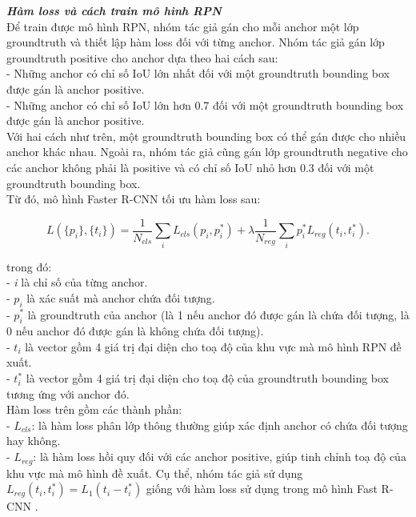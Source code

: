 {    \noindent
    \textbf{\textit{Hàm loss và cách train mô hình RPN}} \\
    Để train được mô hình RPN, nhóm tác giả gán cho mỗi anchor một lớp groundtruth và thiết lập hàm loss đối với từng anchor.
    Nhóm tác giả gán lớp groundtruth positive cho anchor dựa theo hai cách sau: \\
    - Những anchor có chỉ số IoU lớn nhất đối với một groundtruth bounding box được gán là anchor positive. \\
    - Những anchor có chỉ số IoU lớn hơn 0.7 đối với một groundtruth bounding box được gán là anchor positive. \\
    Với hai cách như trên, một groundtruth bounding box có thể gán được cho nhiều anchor khác nhau.
    Ngoài ra, nhóm tác giả cũng gán lớp groundtruth negative cho các anchor không phải là positive và có chỉ số IoU nhỏ hơn 0.3 đối với một groundtruth bounding box. \\
    Từ đó, mô hình Faster R-CNN tối ưu hàm loss sau:

    \begin{equation}
        \label{eq:faster_rcnn_loss}
        L(\{p_i\}, \{t_i\}) = \frac{1}{N_{cls}}\sum_i L_{cls}(p_i, p^{*}_i) + \lambda\frac{1}{N_{reg}}\sum_i  p^{*}_i L_{reg}(t_i, t^{*}_i).
    \end{equation}

    \noindent
    trong đó: \\
    - \textit{i} là chỉ số của từng anchor. \\
    - \textit{$p_i$} là xác suất mà anchor chứa đối tượng. \\
    - \textit{$p^{*}_i$} là groundtruth của anchor (là 1 nếu anchor đó được gán là chứa đối tượng, là 0 nếu anchor đó được gán là không chứa đối tượng). \\
    - \textit{$t_i$} là vector gồm 4 giá trị đại diện cho toạ độ của khu vực mà mô hình RPN đề xuất. \\
    - \textit{$t^{*}_i$} là vector gồm 4 giá trị đại diện cho toạ độ của groundtruth bounding box tương ứng với anchor đó. \\
    Hàm loss trên gồm các thành phần: \\
    - \textit{$L_{cls}$}: là hàm loss phân lớp thông thường giúp xác định anchor có chứa đối tượng hay không. \\
    - \textit{$L_{reg}$}: là hàm loss hồi quy đối với các anchor positive, giúp tinh chỉnh toạ độ của khu vực mà mô hình đề xuất.
    Cụ thể, nhóm tác giả sử dụng $L_{reg}(t_i, t^{*}_i)=L_1(t_i - t^{*}_i)$ giống với hàm loss sử dụng trong mô hình Fast R-CNN \cite{girshick2015fast}.

}
